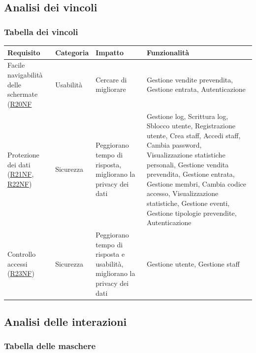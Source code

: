 \documentclass[a4paper]{article}
\begin{document}
\subsection{Analisi dei vincoli}
\subsubsection{Tabella dei vincoli}



\begin{center}
    \begin{tabularx}{1\textwidth}{|X|X|X|X|}
    \hline
    \textbf{Requisito} & \textbf{Categoria} & \textbf{Impatto} & \textbf{Funzionalità}\\
    \hline
    \hline
    Facile navigabilità delle schermate (\hyperlink{R20NF}{R20NF} & Usabilità & Cercare di migliorare & Gestione vendite prevendita,  Gestione entrata, Autenticazione\\
    \hline
    Protezione dei dati (\hyperlink{R21NF}{R21NF}, \hyperlink{R22NF}{R22NF}) & Sicurezza & Peggiorano tempo di risposta, migliorano la privacy dei dati & Gestione log, Scrittura log, Sblocco utente, Registrazione utente, Crea staff, Accedi staff, Cambia password, Visualizzazione statistiche personali, Gestione vendita prevendita, Gestione entrata, Gestione membri, Cambia codice accesso, Visualizzazione statistiche, Gestione eventi, Gestione tipologie prevendite, Autenticazione\\
    \hline
    Controllo accessi (\hyperlink{R23NF}{R23NF}) & Sicurezza & Peggiorano tempo di risposta e usabilità, migliorano la privacy dei dati & Gestione utente, Gestione staff\\
    \hline
    \end{tabularx}
\end{center}

\newpage

\subsection{Analisi delle interazioni}
\subsubsection{Tabella delle maschere}
\end{document}
